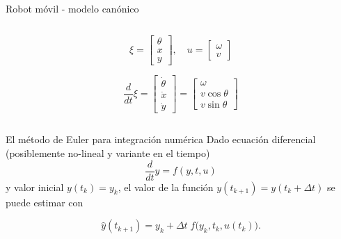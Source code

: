 \documentclass[presentation,aspectratio=169]{beamer}
\begin{document}
\begin{frame}[label={sec:org9031737}]{Robot móvil - modelo canónico}
\begin{columns}
\begin{column}{0.6\columnwidth}
\pause


\[ \xi = \begin{bmatrix} \theta\\x\\y \end{bmatrix},   \quad u = \begin{bmatrix} \omega\\v \end{bmatrix}\]



\[\frac{d}{dt} \xi = \begin{bmatrix} \dot{\theta}\\\dot{x}\\\dot{y} \end{bmatrix} = \begin{bmatrix} \omega\\ v\cos\theta\\v\sin\theta\end{bmatrix} \]
\end{column}
\end{columns}
\end{frame}

\begin{frame}[label={sec:org6c69ecd}]{El método de Euler para integración numérica}
Dado ecuación diferencial (posiblemente no-lineal y variante en el tiempo)
\[ \frac{d}{dt} y = f(y,t, u) \]
y valor inicial \(y(t_k) = y_k\),
el valor de la función \(y(t_{k+1}) = y(t_k + \Delta t)\) se puede estimar con

\[\hat{y}(t_{k+1}) = y_k + \Delta t \;f\big(y_k, t_k, u(t_k)\big). \]
\end{frame}
\end{document}
